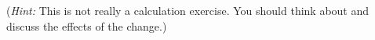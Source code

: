 \documentclass[a4paper,12pt]{article}
\begin{document}
\begin{enumerate}
    (\emph{Hint:} This is not really a calculation exercise. You should think about and discuss the effects of the change.)
\end{enumerate}

\newpage


\end{document}

